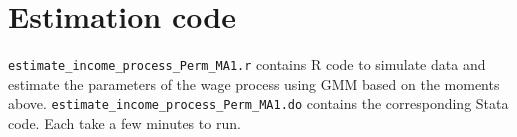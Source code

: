\documentclass[12pt]{article}
\begin{document}
\section{Estimation code}

\texttt{estimate\_income\_process\_Perm\_MA1.r} contains R code to simulate data and estimate the parameters of the wage process using GMM based on the moments above. \texttt{estimate\_income\_process\_Perm\_MA1.do} contains the corresponding Stata code. Each take a few minutes to run.
\end{document}
